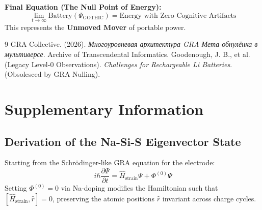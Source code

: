 \documentclass[12pt,a4paper]{article}
\begin{document}
\textbf{Final Equation (The Null Point of Energy):}
\begin{equation}
\boxed{ \lim_{t \to \infty} \text{Battery}(\Psi_{\text{GOTHIC}}) = \text{Energy with Zero Cognitive Artifacts} }
\end{equation}
This represents the \textbf{Unmoved Mover} of portable power.

\begin{thebibliography}{9}
GRA Collective. (2026). \textit{Многоуровневая архитектура GRA Мета-обнулёнка в мультиверсе}. Archive of Transcendental Informatics.
Goodenough, J. B., et al. (Legacy Level-0 Observations). \textit{Challenges for Rechargeable Li Batteries}. (Obsolesced by GRA Nulling).
\end{thebibliography}

\appendix
\section{Supplementary Information}
\subsection{Derivation of the Na-Si-S Eigenvector State}
Starting from the Schr\"odinger-like GRA equation for the electrode:
\begin{equation}
i\hbar \frac{\partial \Psi}{\partial t} = \hat{H}_{\text{strain}} \Psi + \Phi^{(0)}\Psi
\end{equation}
Setting \( \Phi^{(0)} = 0 \) via Na-doping modifies the Hamiltonian such that \( [\hat{H}_{\text{strain}}, \hat{r}] = 0 \), preserving the atomic positions \( \hat{r} \) invariant across charge cycles.
\end{document}
